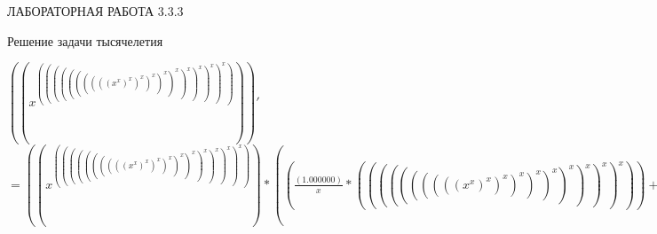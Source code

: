 \documentclass[a4paper, 12 pt]{article}
\begin{document}
	\begin{center}
	ЛАБОРАТОРНАЯ РАБОТА 3.3.3

	Решение задачи тысячелетия
	\end{center}
	\newpage
	$\left((x^{((((((((((x^{x})^{x})^{x})^{x})^{x})^{x})^{x})^{x})^{x})^{x})})\right)'$
	$= ((x^{((((((((((x^{x})^{x})^{x})^{x})^{x})^{x})^{x})^{x})^{x})^{x})})*((\frac{\left(1.000000\right)}{x}*((((((((((x^{x})^{x})^{x})^{x})^{x})^{x})^{x})^{x})^{x})^{x}))+(ln{x}*(((((((((((x^{x})^{x})^{x})^{x})^{x})^{x})^{x})^{x})^{x})^{x})*(((\frac{\left(1.000000\right)}{(((((((((x^{x})^{x})^{x})^{x})^{x})^{x})^{x})^{x})^{x})}*((((((((((x^{x})^{x})^{x})^{x})^{x})^{x})^{x})^{x})^{x})*(((\frac{\left(1.000000\right)}{((((((((x^{x})^{x})^{x})^{x})^{x})^{x})^{x})^{x})}*(((((((((x^{x})^{x})^{x})^{x})^{x})^{x})^{x})^{x})*(((\frac{\left(1.000000\right)}{(((((((x^{x})^{x})^{x})^{x})^{x})^{x})^{x})}*((((((((x^{x})^{x})^{x})^{x})^{x})^{x})^{x})*(((\frac{\left(1.000000\right)}{((((((x^{x})^{x})^{x})^{x})^{x})^{x})}*(((((((x^{x})^{x})^{x})^{x})^{x})^{x})*(((\frac{\left(1.000000\right)}{(((((x^{x})^{x})^{x})^{x})^{x})}*((((((x^{x})^{x})^{x})^{x})^{x})*(((\frac{\left(1.000000\right)}{((((x^{x})^{x})^{x})^{x})}*(((((x^{x})^{x})^{x})^{x})*(((\frac{\left(1.000000\right)}{(((x^{x})^{x})^{x})}*((((x^{x})^{x})^{x})*(((\frac{\left(1.000000\right)}{((x^{x})^{x})}*(((x^{x})^{x})*(((\frac{\left(1.000000\right)}{(x^{x})}*((x^{x})*((\frac{\left(1.000000\right)}{x}*x)+ln{x})))*x)+ln{(x^{x})})))*x)+ln{((x^{x})^{x})})))*x)+ln{(((x^{x})^{x})^{x})})))*x)+ln{((((x^{x})^{x})^{x})^{x})})))*x)+ln{(((((x^{x})^{x})^{x})^{x})^{x})})))*x)+ln{((((((x^{x})^{x})^{x})^{x})^{x})^{x})})))*x)+ln{(((((((x^{x})^{x})^{x})^{x})^{x})^{x})^{x})})))*x)+ln{((((((((x^{x})^{x})^{x})^{x})^{x})^{x})^{x})^{x})})))*x)+ln{(((((((((x^{x})^{x})^{x})^{x})^{x})^{x})^{x})^{x})^{x})})))))$
\end{document}
